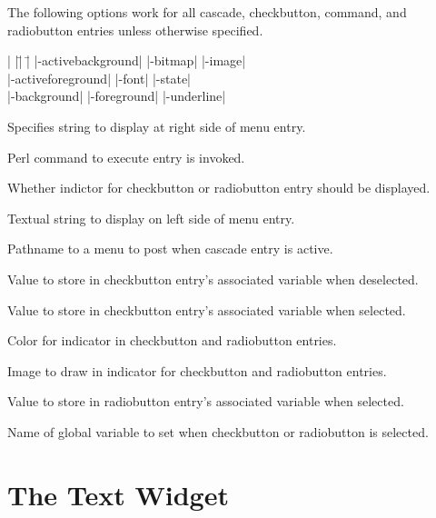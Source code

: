 The following options work for all cascade, checkbutton, command,
and radiobutton entries unless otherwise specified.

\begin{tabbing}
|                   |\=|                  |\= \kill
|-activebackground| \> |-bitmap|          \> |-image| \\
|-activeforeground| \> |-font|            \> |-state| \\
|-background|       \> |-foreground|      \> |-underline| \\
\end{tabbing}

\begin{enum}{1cm}

Specifies string to display at right side of menu entry.

Perl command to execute  entry is invoked.

Whether indictor for checkbutton or radiobutton entry should be displayed.

Textual string to display on left side of menu entry.

Pathname to a menu to post when cascade entry is active.

Value to store in checkbutton entry's associated variable when deselected.

Value to store in checkbutton entry's associated variable when selected.

Color for indicator in checkbutton and radiobutton entries.

Image to draw in indicator for checkbutton and radiobutton entries.

Value to store in radiobutton entry's associated variable when selected.

Name of global variable to set when checkbutton or radiobutton is selected.

\end{enum}


\section{The Text Widget}

